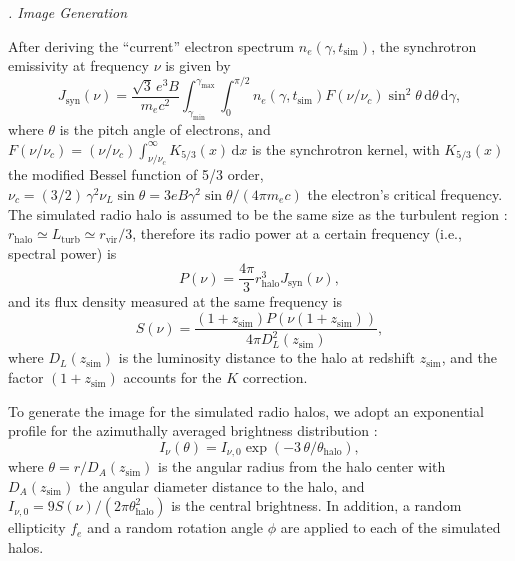 \documentclass[modern]{aastex62}
\newcommand{\R}[1]{\mathrm{#1}}
\newcommand{\D}[1]{\R{d} #1}
\newcounter{sssseccount}
\newcommand{\sssseclabel}{\alph{sssseccount}}
\newcommand{\ssssec}[1]{%
  \vspace{1ex}%
  \stepcounter{sssseccount}%
  \noindent\emph{\sssseclabel. #1}%
}
\begin{document}
\ssssec{Image Generation}

After deriving the \enquote{current} electron spectrum
$n_e(\gamma, t_{\R{sim}})$, the synchrotron emissivity at frequency
$\nu$ is given by \citep{rybicki1979}
\begin{equation}
  \label{sec:jnu-sync}
  J_{\R{syn}}(\nu) = \frac{\sqrt{3} \, e^3 B}{m_e c^2}
    \!\int_{\gamma_{\R{min}}}^{\gamma_{\R{max}}} \!\!\!\int_0^{\pi/2}\!
    n_e(\gamma, t_{\R{sim}}) F(\nu/\nu_c)
    \sin^2 \!\theta \,\D{\theta} \,\D{\gamma},
\end{equation}
where $\theta$ is the pitch angle of electrons,
and $F(\nu/\nu_c) = (\nu/\nu_c) \int_{\nu/\nu_c}^{\infty} K_{5/3}(x) \,\D{x}$
is the synchrotron kernel,
with $K_{5/3}(x)$ the modified Bessel function of 5/3 order,
$\nu_c = (3/2) \,\gamma^2 \nu_L \sin\theta
= 3 e B \gamma^2 \sin\theta / (4\pi m_e c)$
the electron's critical frequency.
The simulated radio halo is assumed to be the same size as the turbulent
region \citep[e.g.,][]{vazza2011}:
$r_{\R{halo}} \simeq L_{\R{turb}} \simeq r_{\R{vir}}/3$,
therefore its radio power at a certain frequency (i.e., spectral power) is
\begin{equation}
  \label{eq:halo-power}
  P(\nu) = \frac{4\pi}{3} r_{\R{halo}}^3 J_{\R{syn}}(\nu),
\end{equation}
and its flux density measured at the same frequency is
\citep[e.g.,][]{hogg1999}
\begin{equation}
  \label{eq:halo-flux}
  S(\nu) = \frac{(1+z_{\R{sim}}) P(\nu(1+z_{\R{sim}}))}{4\pi D_{\!L}^2(z_{\R{sim}})},
\end{equation}
where $D_{\!L}(z_{\R{sim}})$ is the luminosity distance to the halo at
redshift $z_{\R{sim}}$,
and the factor $(1 + z_{\R{sim}})$ accounts for the $K$ correction.

To generate the image for the simulated radio halos, we adopt an exponential
profile for the azimuthally averaged brightness distribution \citep{murgia2009}:
\begin{equation}
  \label{eq:halo-profile}
  I_{\nu}(\theta) = I_{\nu,0} \exp(-3 \,\theta / \theta_{\R{halo}}),
\end{equation}
where $\theta = r / D_{\!A}(z_{\R{sim}})$ is the angular radius from the halo
center with $D_{\!A}(z_{\R{sim}})$ the angular diameter distance to the halo,
and $I_{\nu,0} = 9 S(\nu) / (2\pi \theta^2_{\R{halo}})$ is the central
brightness.
In addition, a random ellipticity $f_e$ and a random rotation angle
$\phi$ are applied to each of the simulated halos.
\end{document}
